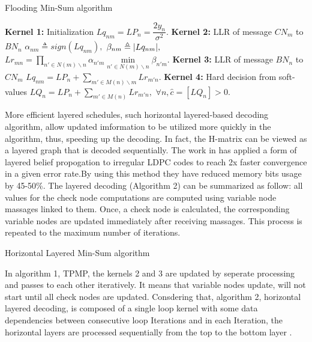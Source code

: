 \documentclass[conference]{IEEEtran}
\DeclarePairedDelimiter\abs{\lvert}{\rvert}%
\begin{document}
\begin{algorithm}\label{algorithm1}
\renewcommand\thealgorithm{}
\caption{Flooding Min-Sum algorithm}
\begin{algorithmic}
\STATE \textbf{Kernel 1:} Initialization
\STATE
$Lq_{nm}=LP_n=\dfrac{2y_n}{\sigma^2}.$
\ENDIF
\ENDFOR
{}
\STATE \textbf{Kernel 2:} LLR of message $CN_m$ to $BN_n$
\STATE $\alpha_{nm} \triangleq sign(Lq_{nm}),$
\STATE $\beta_{nm} \triangleq \abs{Lq_{nm}},$
\STATE $Lr_{mn} = \prod\limits_{n' \in N(m)\backslash n} \alpha_{n'm} \min\limits_{n' \in N(m)\backslash n} \beta_{n'm}.$
\ENDFOR
\STATE \textbf{Kernel 3:} LLR of message $BN_n$ to $CN_m$
\STATE $Lq_{nm} = LP_n + \sum\limits_{m' \in M(n)\backslash m} Lr_{m'n}.$
\ENDFOR  
\ENDFOR %
\STATE \textbf{Kernel 4:} Hard decision from soft-values
\STATE $LQ_{n} = LP_n + \sum\limits_{m' \in M(n)} Lr_{m'n},$
\STATE $\forall n, \hat{c}=[LQ_n]>0.$
\ENDFOR
\end{algorithmic}
\addtocounter{algorithm}{-1}
\end{algorithm}

More efficient layered schedules, such horizontal layered-based decoding algorithm, allow updated imformation to be utilized more quickly in the algorithm, thus, speeding up the decoding\cite{art_layered0, art_layered1}. In fact, the H-matrix can be viewed as a layered graph that is decoded sequentially. The work in \cite{art_gpu_0} has applied a form of layered belief propogation to irregular LDPC codes to reach 2x faster convergence in a given error rate.By using this method they have reduced memory bits usage by 45-50\%. The layered decoding (Algorithm 2) can be summarized as follow: all values for the check node computations are computed using variable node massages linked to them. Once, a check node is calculated, the corresponding variable nodes are updated immediately after receiving massages. This process is repeated to the maximum number of iterations.
\begin{algorithm}\label{algorithm2}
\renewcommand\thealgorithm{}
\caption{Horizontal Layered Min-Sum algorithm}
\begin{algorithmic}
\STATE
\end{algorithmic}
\addtocounter{algorithm}{-1}
\end{algorithm}

In algorithm 1, TPMP, the kernels 2 and 3 are updated by seperate processing and passes to each other iteratively. It means that variable nodes update, will not start until all check nodes are updated. Consdering that, algorithm 2, horizontal layered decoding, is composed of a single loop kernel with some data dependencies between consecutive loop Iterations and in each Iteration, the horizontal layers are processed sequentially from the top to the bottom layer \cite{art_quasi}.
\end{document}
